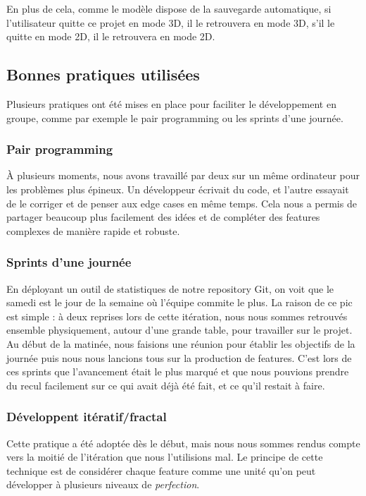 	En plus de cela, comme le modèle dispose de la sauvegarde automatique, 
	si l'utilisateur quitte ce projet en mode 3D, il le retrouvera en mode 3D,
	s'il le quitte en mode 2D, il le retrouvera en mode 2D.

\subsection{Bonnes pratiques utilisées}
Plusieurs pratiques ont été mises en place pour faciliter le développement en 
groupe, comme par exemple le pair programming ou les sprints d'une journée.

	\subsubsection{Pair programming}
	\`A plusieurs moments, nous avons travaillé par deux sur un même ordinateur pour
	les problèmes plus épineux. Un développeur écrivait du code, et l'autre essayait
	de le corriger et de penser aux edge cases en même temps. Cela nous a permis de 
	partager beaucoup plus facilement des idées et de compléter des features
	complexes de manière rapide et robuste.

	\subsubsection{Sprints d'une journée}
	En déployant un outil de statistiques de notre repository Git, on voit que le 
	samedi est le jour de la semaine où l'équipe commite le plus. La raison de ce 
	pic est simple : à deux reprises lors de cette itération, nous nous sommes
	retrouvés ensemble physiquement, autour d'une grande table, pour travailler sur
	le projet. \\

	Au début de la matinée, nous faisions une réunion pour établir les
	objectifs de la journée puis nous nous lancions tous sur la production de
	features. C'est lors de ces sprints que l'avancement était le plus marqué et 
	que nous pouvions prendre du recul facilement sur ce qui avait déjà été fait, 
	et ce qu'il restait à faire.

	\subsubsection{Développent itératif/fractal}
	Cette pratique a été adoptée dès le début, mais nous nous sommes rendus compte
	vers la moitié de l'itération que nous l'utilisions mal. Le principe de cette
	technique est de considérer chaque feature comme une unité qu'on peut développer
	à plusieurs niveaux de \textit{perfection}. \\

